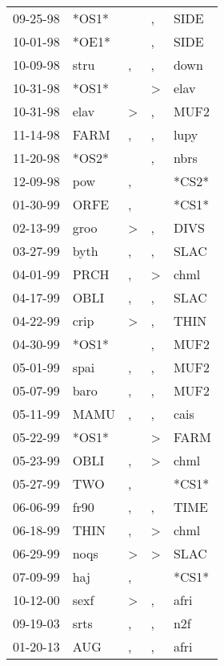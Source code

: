 \begin{supertabular}{lllll}
 09-25-98 &  *OS1* &               &             , &   SIDE \\
 10-01-98 &  *OE1* &               &             , &   SIDE \\
 10-09-98 &   stru &             , &             , &   down \\
 10-31-98 &  *OS1* &               &  \textgreater &   elav \\
 10-31-98 &   elav &  \textgreater &             , &   MUF2 \\
 11-14-98 &   FARM &             , &             , &   lupy \\
 11-20-98 &  *OS2* &               &             , &   nbrs \\
 12-09-98 &    pow &             , &               &  *CS2* \\
 01-30-99 &   ORFE &             , &               &  *CS1* \\
 02-13-99 &   groo &  \textgreater &             , &   DIVS \\
 03-27-99 &   byth &             , &             , &   SLAC \\
 04-01-99 &   PRCH &             , &  \textgreater &   chml \\
 04-17-99 &   OBLI &             , &             , &   SLAC \\
 04-22-99 &   crip &  \textgreater &             , &   THIN \\
 04-30-99 &  *OS1* &               &             , &   MUF2 \\
 05-01-99 &   spai &             , &             , &   MUF2 \\
 05-07-99 &   baro &             , &             , &   MUF2 \\
 05-11-99 &   MAMU &             , &             , &   cais \\
 05-22-99 &  *OS1* &               &  \textgreater &   FARM \\
 05-23-99 &   OBLI &             , &  \textgreater &   chml \\
 05-27-99 &    TWO &             , &               &  *CS1* \\
 06-06-99 &   fr90 &             , &             , &   TIME \\
 06-18-99 &   THIN &             , &  \textgreater &   chml \\
 06-29-99 &   noqs &  \textgreater &  \textgreater &   SLAC \\
 07-09-99 &    haj &             , &               &  *CS1* \\
 10-12-00 &   sexf &  \textgreater &             , &   afri \\
 09-19-03 &   srts &             , &             , &    n2f \\
 01-20-13 &    AUG &             , &             , &   afri \\
\end{supertabular}
